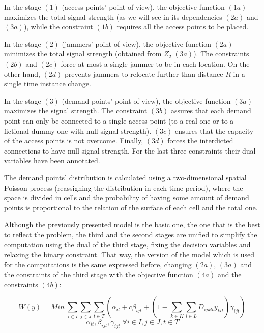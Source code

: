 \documentclass[runningheads]{llncs}
\begin{document}
In the stage $(1)$ (access points' point of view), the objective function $(1a)$ maximizes the total signal strength (as we will see in its dependencies $(2a)$ and $(3a)$), while the constraint $(1b)$ requires all the access points to be placed.

In the stage $(2)$ (jammers' point of view), the objective function $(2a)$ minimizes the total signal strength (obtained from $Z_2 \; (3a)$). The constraints $(2b)$ and $(2c)$ force at most a single jammer to be in each location. On the other hand, $(2d)$ prevents jammers to relocate further than distance $R$ in a single time instance change.

In the stage $(3)$ (demand points' point of view), the objective function $(3a)$ maximizes the signal strength. The constraint $(3b)$ assures that each demand point can only be connected to a single access point (to a real one or to a fictional dummy one with null signal strength). $(3c)$ ensures that the capacity of the access points is not overcome. Finally, $(3d)$ forces the interdicted connections to have null signal strength. For the last three constraints their dual variables have been annotated.

The demand points' distribution is calculated using a two-dimensional spatial Poisson process (reassigning the distribution in each time period), where the space is divided in cells and the probability of having some amount of demand points is proportional to the relation of the surface of each cell and the total one.

Although the previously presented model is the basic one, the one that is the best to reflect the problem, the third and the second stages are unified to simplify the computation using the dual of the third stage, fixing the decision variables and relaxing the binary constraint. That way, the version of the model which is used for the computations is the same expressed before, changing $(2a)$, $(3a)$ and the constraints of the third stage with the objective function $(4a)$ and the constraints $(4b)$:

\begin{equation}\tag{4a}
    W(y) = Min \; \sum_{i \in I} \sum_{j \in J} \sum_{t \in T} (\alpha_{it} + c \beta_{ijt} + (1 - \sum_{k \in K} \sum_{l \in L} D_{ijklt} y_{klt}) \gamma_{ijt})
\end{equation}
\begin{equation}\tag{4b}
    \alpha_{it}, \beta_{ijt}, \gamma_{ijt} \; \forall i \in I, j \in J, t \in T
\end{equation}
\end{document}
